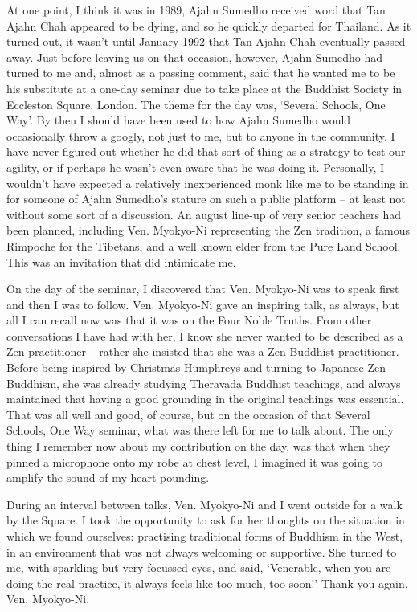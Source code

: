 At one point, I think it was in 1989, Ajahn Sumedho received word that
Tan Ajahn Chah appeared to be dying, and so he quickly departed for
Thailand. As it turned out, it wasn't until January 1992 that Tan Ajahn
Chah eventually passed away. Just before leaving us on that occasion,
however, Ajahn Sumedho had turned to me and, almost as a passing
comment, said that he wanted me to be his substitute at a one-day
seminar due to take place at the Buddhist Society in Eccleston Square,
London. The theme for the day was, `Several Schools, One Way'. By then I
should have been used to how Ajahn Sumedho would occasionally throw a
googly, not just to me, but to anyone in the community. I have never
figured out whether he did that sort of thing as a strategy to test our
agility, or if perhaps he wasn't even aware that he was doing it.
Personally, I wouldn't have expected a relatively inexperienced monk
like me to be standing in for someone of Ajahn Sumedho's stature on such
a public platform -- at least not without some sort of a discussion. An
august line-up of very senior teachers had been planned, including Ven.
Myokyo-Ni representing the Zen tradition, a famous Rimpoche for the
Tibetans, and a well known elder from the Pure Land School. This was an
invitation that did intimidate me.

On the day of the seminar, I discovered that Ven. Myokyo-Ni was to speak
first and then I was to follow. Ven. Myokyo-Ni gave an inspiring talk,
as always, but all I can recall now was that it was on the Four Noble
Truths. From other conversations I have had with her, I know she never
wanted to be described as a Zen practitioner -- rather she insisted that
she was a Zen Buddhist practitioner. Before being inspired by Christmas
Humphreys and turning to Japanese Zen Buddhism, she was already studying
Theravada Buddhist teachings, and always maintained that having a good
grounding in the original teachings was essential. That was all well and
good, of course, but on the occasion of that Several Schools, One Way
seminar, what was there left for me to talk about. The only thing I
remember now about my contribution on the day, was that when they pinned
a microphone onto my robe at chest level, I imagined it was going to
amplify the sound of my heart pounding.

During an interval between talks, Ven. Myokyo-Ni and I went outside for
a walk by the Square. I took the opportunity to ask for her thoughts on
the situation in which we found ourselves: practising traditional forms
of Buddhism in the West, in an environment that was not always welcoming
or supportive. She turned to me, with sparkling but very focussed eyes,
and said, `Venerable, when you are doing the real practice, it always
feels like too much, too soon!' Thank you again, Ven. Myokyo-Ni.

